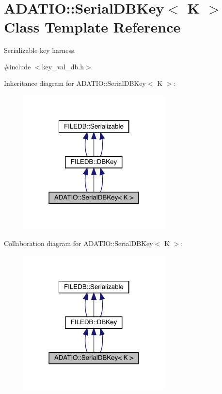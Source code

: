 \hypertarget{classADATIO_1_1SerialDBKey}{}\section{A\+D\+A\+T\+IO\+:\+:Serial\+D\+B\+Key$<$ K $>$ Class Template Reference}
\label{classADATIO_1_1SerialDBKey}


Serializable key harness.  




{\ttfamily \#include $<$key\+\_\+val\+\_\+db.\+h$>$}



Inheritance diagram for A\+D\+A\+T\+IO\+:\+:Serial\+D\+B\+Key$<$ K $>$\+:
\nopagebreak
\begin{figure}[H]
\begin{center}
\leavevmode
\includegraphics[width=219pt]{d9/dbb/classADATIO_1_1SerialDBKey__inherit__graph}
\end{center}
\end{figure}


Collaboration diagram for A\+D\+A\+T\+IO\+:\+:Serial\+D\+B\+Key$<$ K $>$\+:
\nopagebreak
\begin{figure}[H]
\begin{center}
\leavevmode
\includegraphics[width=219pt]{d3/df3/classADATIO_1_1SerialDBKey__coll__graph}
\end{center}
\end{figure}
